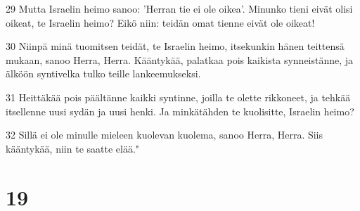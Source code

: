 \par 29 Mutta Israelin heimo sanoo: 'Herran tie ei ole oikea'. Minunko tieni eivät olisi oikeat, te Israelin heimo? Eikö niin: teidän omat tienne eivät ole oikeat!
\par 30 Niinpä minä tuomitsen teidät, te Israelin heimo, itsekunkin hänen teittensä mukaan, sanoo Herra, Herra. Kääntykää, palatkaa pois kaikista synneistänne, ja älköön syntivelka tulko teille lankeemukseksi.
\par 31 Heittäkää pois päältänne kaikki syntinne, joilla te olette rikkoneet, ja tehkää itsellenne uusi sydän ja uusi henki. Ja minkätähden te kuolisitte, Israelin heimo?
\par 32 Sillä ei ole minulle mieleen kuolevan kuolema, sanoo Herra, Herra. Siis kääntykää, niin te saatte elää."

\chapter{19}

